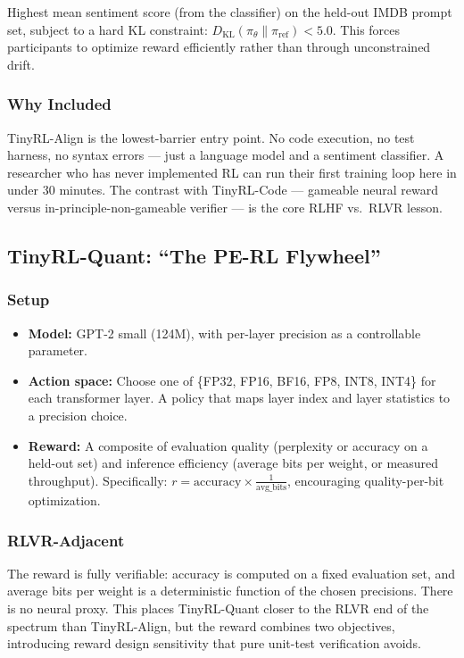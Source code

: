 Highest mean sentiment score (from the classifier) on the held-out IMDB prompt set, subject to a hard KL constraint: $D_{\mathrm{KL}}(\pi_\theta \| \pi_{\mathrm{ref}}) < 5.0$. This forces participants to optimize reward efficiently rather than through unconstrained drift.

\subsubsection*{Why Included}

TinyRL-Align is the lowest-barrier entry point. No code execution, no test harness, no syntax errors --- just a language model and a sentiment classifier. A researcher who has never implemented RL can run their first training loop here in under 30 minutes. The contrast with TinyRL-Code --- gameable neural reward versus in-principle-non-gameable verifier --- is the core RLHF vs.\ RLVR lesson.

\subsection{TinyRL-Quant: ``The PE-RL Flywheel''}

\subsubsection*{Setup}

\begin{itemize}
  \item \textbf{Model:} GPT-2 small (124M), with per-layer precision as a controllable parameter.
  \item \textbf{Action space:} Choose one of \{FP32, FP16, BF16, FP8, INT8, INT4\} for each transformer layer. A policy that maps layer index and layer statistics to a precision choice.
  \item \textbf{Reward:} A composite of evaluation quality (perplexity or accuracy on a held-out set) and inference efficiency (average bits per weight, or measured throughput). Specifically: $r = \text{accuracy} \times \frac{1}{\text{avg\_bits}}$, encouraging quality-per-bit optimization.
\end{itemize}

\subsubsection*{RLVR-Adjacent}

The reward is fully verifiable: accuracy is computed on a fixed evaluation set, and average bits per weight is a deterministic function of the chosen precisions. There is no neural proxy. This places TinyRL-Quant closer to the RLVR end of the spectrum than TinyRL-Align, but the reward combines two objectives, introducing reward design sensitivity that pure unit-test verification avoids.

